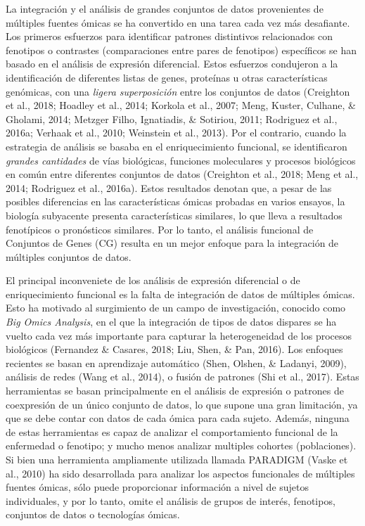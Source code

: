 \documentclass[12pt,twoside]{reedthesis}
\begin{document}
La integración y el análisis de grandes conjuntos de datos provenientes de múltiples fuentes ómicas se ha convertido en una tarea cada vez más desafiante. Los primeros esfuerzos para identificar patrones distintivos relacionados con fenotipos o contrastes (comparaciones entre pares de fenotipos) específicos se han basado en el análisis de expresión diferencial. Estos esfuerzos condujeron a la identificación de diferentes listas de genes, proteínas u otras características genómicas, con una \emph{ligera superposición} entre los conjuntos de datos (Creighton et al., 2018; Hoadley et al., 2014; Korkola et al., 2007; Meng, Kuster, Culhane, \& Gholami, 2014; Metzger Filho, Ignatiadis, \& Sotiriou, 2011; Rodriguez et al., 2016a; Verhaak et al., 2010; Weinstein et al., 2013). Por el contrario, cuando la estrategia de análisis se basaba en el enriquecimiento funcional, se identificaron \emph{grandes cantidades} de vías biológicas, funciones moleculares y procesos biológicos en común entre diferentes conjuntos de datos (Creighton et al., 2018; Meng et al., 2014; Rodriguez et al., 2016a). Estos resultados denotan que, a pesar de las posibles diferencias en las características ómicas probadas en varios ensayos, la biología subyacente presenta características similares, lo que lleva a resultados fenotípicos o pronósticos similares. Por lo tanto, el análisis funcional de Conjuntos de Genes (CG) resulta en un mejor enfoque para la integración de múltiples conjuntos de datos.

\par

El principal inconveniete de los análisis de expresión diferencial o de enriquecimiento funcional es la falta de integración de datos de múltiples ómicas. Esto ha motivado al surgimiento de un campo de investigación, conocido como \emph{Big Omics Analysis}, en el que la integración de tipos de datos dispares se ha vuelto cada vez más importante para capturar la heterogeneidad de los procesos biológicos (Fernandez \& Casares, 2018; Liu, Shen, \& Pan, 2016). Los enfoques recientes se basan en aprendizaje automático (Shen, Olshen, \& Ladanyi, 2009), análisis de redes (Wang et al., 2014), o fusión de patrones (Shi et al., 2017). Estas herramientas se basan principalmente en el análisis de expresión o patrones de coexpresión de un único conjunto de datos, lo que supone una gran limitación, ya que se debe contar con datos de cada ómica para cada sujeto. Además, ninguna de estas herramientas es capaz de analizar el comportamiento funcional de la enfermedad o fenotipo; y mucho menos analizar multiples cohortes (poblaciones). Si bien una herramienta ampliamente utilizada llamada PARADIGM (Vaske et al., 2010) ha sido desarrollada para analizar los aspectos funcionales de múltiples fuentes ómicas, sólo puede proporcionar información a nivel de sujetos individuales, y por lo tanto, omite el análisis de grupos de interés, fenotipos, conjuntos de datos o tecnologías ómicas.
\end{document}
